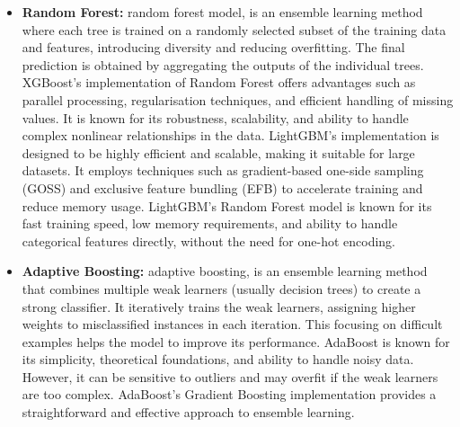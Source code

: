 \begin{itemize}
    
    \item \textbf{Random Forest:} random forest model, is an ensemble learning method where each tree is trained on a randomly selected subset of the training data and features, introducing diversity and reducing overfitting. The final prediction is obtained by aggregating the outputs of the individual trees. XGBoost's implementation of Random Forest offers advantages such as parallel processing, regularisation techniques, and efficient handling of missing values. It is known for its robustness, scalability, and ability to handle complex nonlinear relationships in the data. LightGBM's implementation is designed to be highly efficient and scalable, making it suitable for large datasets. It employs techniques such as gradient-based one-side sampling (GOSS) and exclusive feature bundling (EFB) to accelerate training and reduce memory usage. LightGBM's Random Forest model is known for its fast training speed, low memory requirements, and ability to handle categorical features directly, without the need for one-hot encoding.
    
    \item \textbf{Adaptive Boosting:} adaptive boosting, is an ensemble learning method that combines multiple weak learners (usually decision trees) to create a strong classifier. It iteratively trains the weak learners, assigning higher weights to misclassified instances in each iteration. This focusing on difficult examples helps the model to improve its performance. AdaBoost is known for its simplicity, theoretical foundations, and ability to handle noisy data. However, it can be sensitive to outliers and may overfit if the weak learners are too complex. AdaBoost's Gradient Boosting implementation provides a straightforward and effective approach to ensemble learning.
    

\end{itemize}
